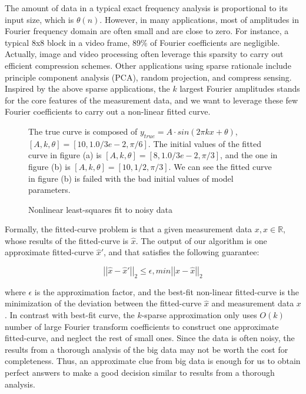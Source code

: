 \documentclass{sig-alternate}
\begin{document}
The amount of data in a typical exact frequency analysis is proportional to its input size, which is $\theta(n)$. However, in many applications, most of amplitudes in Fourier frequency domain are often small and are close to zero. For instance, a typical 8x8 block in a video frame, 89\% of Fourier coefficients are negligible\cite{Hassanieh:2012, Chandrakasan:1996}. Actually, image and video processing often leverage this sparsity to carry out efficient compression schemes. Other applications using sparse rationale include principle component analysis (PCA)\cite{Moore:1981}, random projection\cite{Li:2006}, and compress sensing\cite{Donoho:2006}. Inspired by the above sparse applications, the $k$ largest Fourier amplitudes stands for the core features of the measurement data, and we want to leverage these few Fourier coefficients to carry out a non-linear fitted curve. 
\begin{figure}[ht!]
\caption{Nonlinear least-squares fit to noisy data} The true curve is composed of $y_{true} = A\cdot sin(2\pi kx + \theta)$, $[A, k, \theta] = [10, 1.0/3e-2, \pi/6]$. The initial values of the fitted curve in figure (a) is $[A, k, \theta] = [8, 1.0/3e-2, \pi/3]$, and the one in figure (b) is $[A, k, \theta] = [10, 1/2, \pi/3]$. We can see the fitted curve in figure (b) is failed with the bad initial values of model parameters. 
\end{figure}

Formally, the fitted-curve problem is that a given measurement data $x, x\in \mathbb{R}$, whose results of the fitted-curve is $\hat{x}$. The output of our algorithm is one approximate fitted-curve $\hat{x}'$, and that satisfies the following guarantee:

\begin{displaymath}
\left||\hat{x} - \hat{x}'|\right|_2 \le \epsilon,    
min \left||x - \hat{x}|\right|_2
\end{displaymath}

where $\epsilon$ is the approximation factor, and the best-fit non-linear fitted-curve is the minimization of the deviation between the fitted-curve $\hat{x}$ and measurement data $x$. In contrast with best-fit curve, the $k$-sparse approximation only uses $O(k)$ number of large Fourier transform coefficients to construct one approximate fitted-curve, and neglect the rest of small ones. Since the data is often noisy, the results from a thorough analysis of the big data may not be worth the cost for completeness. Thus, an approximate clue from big data is enough for us to obtain perfect answers to make a good decision similar to results from a thorough analysis.   
\end{document}
